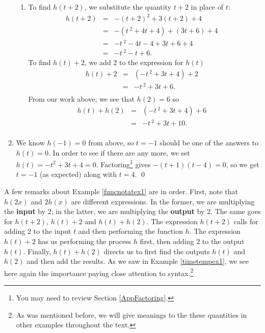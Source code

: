 \documentclass{ximera}
\begin{document}
\begin{ex}
\begin{enumerate}
\begin{enumerate}
\item  To find $h(t + 2)$, we substitute the quantity $t + 2$ in place of $t$: \[ \begin{array}{rclr}  
h(t + 2) & = & -(t + 2)^2 + 3(t + 2) + 4 & \\ [2pt]
         & = & -\left(t\,^{2} + 4t + 4\right) + (3t + 6) + 4 & \\ [2pt]
         & = & -t\,^{2} - 4t - 4 + 3t + 6 + 4 &  \\ [2pt]
         & = & -t\,^{2} - t + 6. & 
       \end{array} \] To find $h(t) + 2$, we add $2$ to the expression for $h(t)$ \[ \begin{array}{rclr}  
h(t) + 2 & = & \left(-t\,^{2} + 3t + 4\right) + 2  & \\ [2pt]
         & = & -t\,^{2} + 3t + 6. \\ 
         \end{array} \] From our work above, we see that $h(2) = 6$ so \[ \begin{array}{rclr}  
h(t) + h(2) & = & \left(-t\,^{2} + 3t + 4\right) + 6  & \\ [2pt]
            & = & -t\,^{2} + 3t + 10. \\ 
            \end{array} \]

\end{enumerate}

\item   We know $h(-1) = 0$ from above, so $t=-1$ should be one of the answers to $h(t) = 0$.  In order to see if there are any more, we set  $h(t) = -t^2+3t+4 = 0$. Factoring\footnote{You may need to review Section \ref{AppFactoring}.} gives $-(t+1)(t-4) = 0$, so we get $t=-1$ (as expected) along with $t=4$. \qed   
         
\end{enumerate}
\end{ex}

A few remarks about Example \ref{funcnotatex1} are in order.  First, note that $h(2x)$ and $2 h(x)$ are different expressions.  In the former, we are multiplying the \textbf{input} by $2$;  in the latter, we are multiplying the \textbf{output} by $2$.  The same goes for $h(t + 2)$, $h(t) + 2$ and $h(t) + h(2)$.  The expression $h(t + 2)$ calls for adding $2$ to the input $t$ and then performing the function $h$.  The expression $h(t) + 2$ has us performing the process $h$ first, then adding $2$ to the output $h(t)$.  Finally, $h(t) + h(2)$ directs us to first find the outputs $h(t)$ and $h(2)$ and then add the results.  As we saw in Example \ref{timetempex1},  we see here again the importance paying close attention to syntax.\footnote{As was mentioned before, we will give meanings to the these quantities in other examples throughout the text.}
\end{document}
